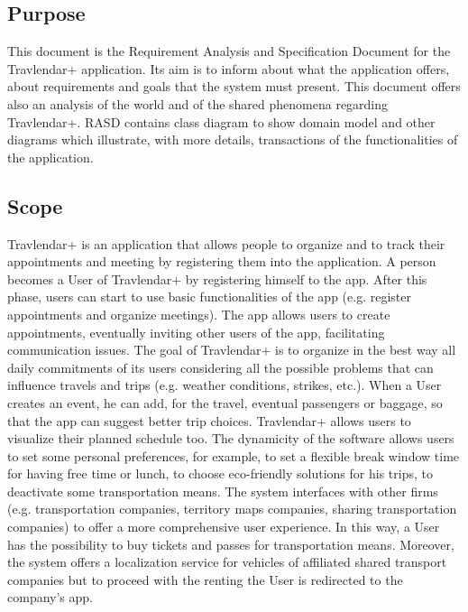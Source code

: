 \subsection{Purpose}
This document is the Requirement Analysis and Specification Document for the Travlendar+ application. Its aim is
to inform about what the application offers, about requirements and goals that the system must present. This document offers also an analysis of the world and of the shared phenomena regarding Travlendar+. RASD contains class diagram to show domain model and other diagrams which illustrate, with more details, transactions of the functionalities of the application.
\subsection{Scope}
Travlendar+ is an application that allows people to organize and to track their appointments and meeting by 
registering them into the application. A person becomes a User of Travlendar+ by registering himself to the app. After this phase, users can start to use basic functionalities of the app (e.g. register appointments and organize meetings).\newline 
The app allows users to create appointments, eventually inviting other users of the app, facilitating communication issues.
The goal of Travlendar+ is to organize in the best way all daily commitments of its users considering all the possible problems that can influence travels and trips (e.g. weather conditions, strikes, etc.).\newline
When a User creates an event, he can add, for the travel, eventual passengers or baggage, so that the app can suggest better trip choices. Travlendar+ allows users to visualize their planned schedule too.\newline 
The dynamicity of the software allows users to set some personal preferences, for example, to set a flexible break window time for having free time or lunch, to choose eco-friendly solutions for his trips, to deactivate some transportation means.\newline 
The system interfaces with other firms (e.g. transportation companies, territory maps companies, sharing transportation companies) to offer a more comprehensive user experience. In this way, a User has the possibility to buy tickets and passes for transportation means. Moreover, the system offers a localization service for vehicles of affiliated shared transport companies but to proceed with the renting the User is redirected to the company's app.


